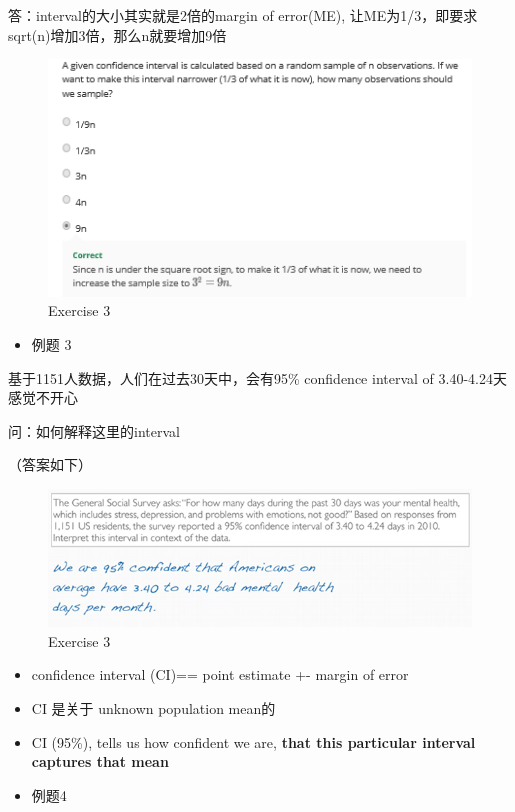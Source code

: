 \documentclass[]{book}
\providecommand{\tightlist}{%
  \setlength{\itemsep}{0pt}\setlength{\parskip}{0pt}}
\begin{document}
答：interval的大小其实就是2倍的margin of error(ME),
让ME为1/3，即要求sqrt(n)增加3倍，那么n就要增加9倍

\begin{figure}

{\centering \includegraphics[width=0.8\linewidth]{graphs/2-15} 

}

\caption{Exercise 3}\label{fig:fig2-15}
\end{figure}

\begin{itemize}
\tightlist
\item
  例题 3
\end{itemize}

基于1151人数据，人们在过去30天中，会有95\% confidence interval of
3.40-4.24天感觉不开心

问：如何解释这里的interval

（答案如下）

\begin{figure}

{\centering \includegraphics[width=0.8\linewidth]{graphs/2-16} 

}

\caption{Exercise 3}\label{fig:fig2-16}
\end{figure}

\begin{itemize}
\item
  confidence interval (CI)== point estimate +- margin of error
\item
  CI 是关于 unknown population mean的
\item
  CI (95\%), tells us how confident we are, \textbf{that this particular
  interval captures that mean}
\item
  例题4
\end{itemize}
\end{document}
